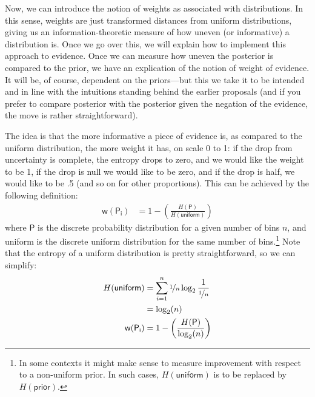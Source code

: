 \documentclass[
  10pt,
  dvipsnames,enabledeprecatedfontcommands]{scrartcl}
\begin{document}
Now, we can introduce the notion of weights as associated with
distributions. In this sense, weights are just transformed distances
from uniform distributions, giving us an information-theoretic measure
of how uneven (or informative) a distribution is. Once we go over this,
we will explain how to implement this approach to evidence. Once we can
measure how uneven the posterior is compared to the prior, we have an
explication of the notion of weight of evidence. It will be, of course,
dependent on the priors---but this we take it to be intended and in line
with the intuitions standing behind the earlier proposals (and if you
prefer to compare posterior with the posterior given the negation of the
evidence, the move is rather straightforward).

The idea is that the more informative a piece of evidence is, as
compared to the uniform distribution, the more weight it has, on scale 0
to 1: if the drop from uncertainty is complete, the entropy drops to
zero, and we would like the weight to be 1, if the drop is null we would
like to be zero, and if the drop is half, we would like to be .5 (and so
on for other proportions). This can be achieved by the following
definition: \begin{align*}
\mathsf{w(P_i)} & = 1 - \left( \frac{H(\mathsf{P})}{H(\mathsf{uniform})}\right)
\end{align*} \noindent where \(\mathsf{P}\) is the discrete probability
distribution for a given number of bins \(n\), and uniform is the
discrete uniform distribution for the same number of bins.\footnote{In
  some contexts it might make sense to measure improvement with respect
  to a non-uniform prior. In such cases, \(H(\mathsf{uniform})\) is to
  be replaced by \(H(\mathsf{prior})\).} Note that the entropy of a
uniform distribution is pretty straightforward, so we can simplify:
\begin{align*}
H(\mathsf{uniform}) & = \sum_{i=1}^n \nicefrac{1}{n} \log_2 \frac{1}{\nicefrac{1}{n}} \\
& = \log_2(n) \\
\mathsf{w(P_i)} & = 1 - \left( \frac{H(\mathsf{P})}{\log_2(n)}\right)
\end{align*}
\end{document}
